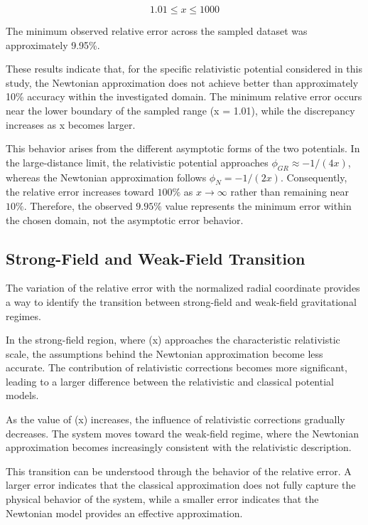 \documentclass[
]{article}
\begin{document}
\[
1.01 \le x \le 1000
\]

The minimum observed relative error across the sampled dataset was
approximately 9.95\%.

These results indicate that, for the specific relativistic potential
considered in this study, the Newtonian approximation does not achieve
better than approximately 10\% accuracy within the investigated domain.
The minimum relative error occurs near the lower boundary of the sampled
range (x = 1.01), while the discrepancy increases as x becomes larger.

This behavior arises from the different asymptotic forms of the two
potentials. In the large-distance limit, the relativistic potential
approaches $\phi_{GR} \approx -1/(4x)$, whereas the Newtonian approximation follows
$\phi_{N} = -1/(2x)$. Consequently, the relative error increases toward $100\%$
as $x \to \infty$ rather than remaining near $10\%$. Therefore, the observed $9.95\%$
value represents the minimum error within the chosen domain, not the
asymptotic error behavior.

\subsection{Strong-Field and Weak-Field Transition}\label{strong-field-and-weak-field-transition}

The variation of the relative error with the normalized radial
coordinate provides a way to identify the transition between
strong-field and weak-field gravitational regimes.

In the strong-field region, where (x) approaches the characteristic
relativistic scale, the assumptions behind the Newtonian approximation
become less accurate. The contribution of relativistic corrections
becomes more significant, leading to a larger difference between the
relativistic and classical potential models.

As the value of (x) increases, the influence of relativistic corrections
gradually decreases. The system moves toward the weak-field regime,
where the Newtonian approximation becomes increasingly consistent with
the relativistic description.

This transition can be understood through the behavior of the relative
error. A larger error indicates that the classical approximation does
not fully capture the physical behavior of the system, while a smaller
error indicates that the Newtonian model provides an effective
approximation.
\end{document}
